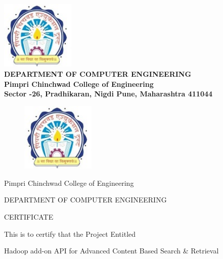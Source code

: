 \documentclass[oneside,a4paper,12pt]{report}
\begin{document}
\begin{center}
\includegraphics[width=100pt]{collegelogo.jpg} \\
{\bfseries \fontsize{14}{12} \selectfont DEPARTMENT OF COMPUTER ENGINEERING \\
Pimpri Chinchwad College of Engineering \\
Sector -26, Pradhikaran, Nigdi Pune, Maharashtra 411044
}
\end{center}

\newpage



\begin{figure}[ht]
\centering
\includegraphics[width=100pt]{collegelogo.jpg}
\end{figure}


{\bfseries \fontsize{14}{12} \selectfont \centerline{Pimpri Chinchwad College of Engineering}
\centerline{DEPARTMENT OF COMPUTER ENGINEERING}
\vspace*{3\baselineskip}} 


{\bfseries \fontsize{16}{12} \selectfont \centerline{CERTIFICATE} 
\vspace*{3\baselineskip}} 

\centerline{This is to certify that the Project Entitled}
\vspace*{1\baselineskip} 


{\bfseries \fontsize{14}{12} \selectfont \centerline{Hadoop add-on API for Advanced Content Based Search \& Retrieval}
\vspace*{1\baselineskip}}

\end{document}
